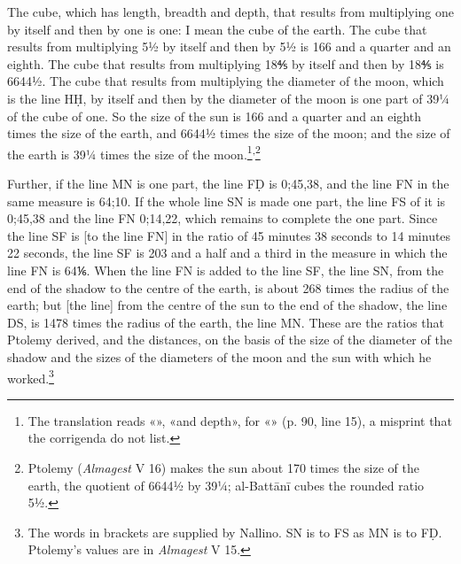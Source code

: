 \documentclass[11pt]{article}
\newcommand{\ArPage}[1]{\marginpar{\footnotesize\color{gray}Ar.\,p.\,#1}}
\begin{document}
\par \ArPage{91}The cube, which has length, breadth and depth, that results from multiplying one by itself and then by one is one: I mean the cube of the earth. The cube that results from multiplying 5½ by itself and then by 5½ is 166 and a quarter and an eighth. The cube that results from multiplying 18⅘ by itself and then by 18⅘ is 6644½. The cube that results from multiplying the diameter of the moon, which is the line HḤ, by itself and then by the diameter of the moon is one part of 39¼ of the cube of one. So the size of the sun is 166 and a quarter and an eighth times the size of the earth, and 6644½ times the size of the moon; and the size of the earth is 39¼ times the size of the moon.\footnote{The translation reads «», «and depth», for «» (p. 90, line 15), a misprint that the corrigenda do not list.}\textsuperscript{,}\footnote{Ptolemy (\emph{Almagest} V 16) makes the sun about 170 times the size of the earth, the quotient of 6644½ by 39¼; al-Battānī cubes the rounded ratio 5½.}\par
\par Further, if the line MN is one part, the line FḌ is 0;45,38, and the line FN in the same measure is 64;10. If the whole line SN is made one part, the line FS of it is 0;45,38 and the line FN 0;14,22, which remains to complete the one part. Since the line SF is [to the line FN] in the ratio of 45 minutes 38 seconds to 14 minutes 22 seconds, the line SF is 203 and a half and a third in the measure in which the line FN is 64⅙. When the line FN is added to the line SF, the line SN, from the end of the shadow to the centre of the earth, is about 268 times the radius of the earth; but [the line] from the centre of the sun to the end of the shadow, the line DS, is 1478 times the radius of the earth, the line MN. These are the ratios that Ptolemy derived, and the distances, on the basis of the size of the diameter of the shadow and the sizes of the diameters of the moon and the sun with which he worked.\footnote{The words in brackets are supplied by Nallino. SN is to FS as MN is to FḌ. Ptolemy's values are in \emph{Almagest} V 15.}\par
\end{document}
